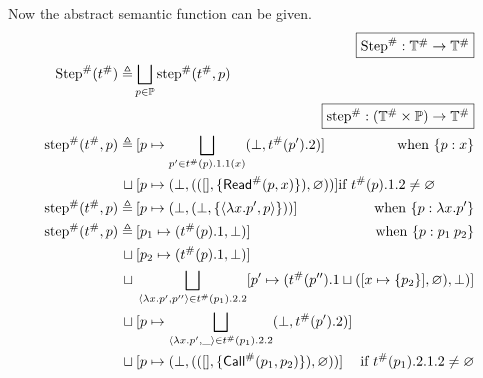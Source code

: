 Now the abstract semantic function can be given.
\begin{align*}
                                     & \pushright{\fbox{$\Abs\Step:\Abs{\mathbb{T}}\rightarrow\Abs{\mathbb{T}}$}}                                                                         \\
  \Abs\Step(\Abs\ptree)   \triangleq & \bigsqcup_{p\in\mathbb{P}}\Abs\step(\Abs\ptree,p)                                                                                                  \\
                                     & \pushright{\fbox{$\Abs\step:(\Abs{\mathbb{T}}\times\mathbb{P})\rightarrow\Abs{\mathbb{T}}$}}                                                       \\
  \Abs\step(\Abs\ptree,p) \triangleq & \specialcell{\:[p\mapsto\bigsqcup_{p'\in\Abs\ptree(p).1.1(x)}(\bot,\Abs\ptree(p').2)]\hfill\textnormal{when }\plabel{p}{x}}                        \\
  \sqcup                             & \: [p\mapsto(\bot,(([],\{\Abs\ReadE(p,x)\}),\varnothing))]\hfill\textnormal{if }\Abs\ptree(p).1.2\neq\varnothing                                   \\
  \Abs\step(\Abs\ptree,p) \triangleq & \specialcell{\:[p\mapsto(\bot,(\bot,\{\langle\lambda x.p',p\rangle\}))]\hfill\textnormal{when }\plabel{p}{\lambda x.p'}}                           \\
  \Abs\step(\Abs\ptree,p) \triangleq & \specialcell{\:[p_1\mapsto(\Abs\ptree(p).1,\bot)]\hfill\textnormal{when }\plabel{p}{p_1\:p_2}}                                                     \\
  \sqcup                             & \: [p_2\mapsto(\Abs\ptree(p).1,\bot)]                                                                                                              \\
  \sqcup                             & \: \bigsqcup_{\langle\lambda x.p',p''\rangle\in\Abs\ptree(p_1).2.2}[p'\mapsto(\Abs\ptree(p'').1\sqcup([x\mapsto\{p_2\}],\varnothing),\bot)]        \\
  \sqcup                             & \: [p\mapsto\bigsqcup_{\langle\lambda x.p',\_\rangle\in\Abs\ptree(p_1).2.2}(\bot,\Abs\ptree(p').2)]                                                \\
  \sqcup                             & \specialcell{\:[p\mapsto(\bot,(([],\{\Abs\CallE(p_1,p_2)\}),\varnothing))]\hfill\textnormal{if }\Abs\ptree(p_1).2.1.2\neq\varnothing}              \\

\end{align*}

